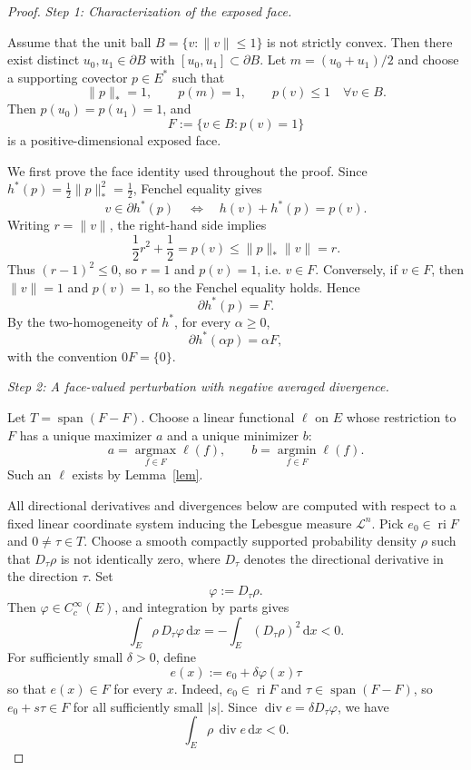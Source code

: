 \documentclass[10pt,a4paper]{amsart}
\numberwithin{equation}{section}
\newcommand{\ri}{\operatorname{ri}}
\newcommand{\diver}{\operatorname{div}}
\newcommand{\argmin}{\operatorname*{argmin}}
\newcommand{\argmax}{\operatorname*{argmax}}
\newcommand{\dd}{\mathrm d}
\begin{document}
	\begin{proof}
	
	\emph{Step 1: Characterization of the exposed face.} 
	
	Assume that the unit ball $B=\{v:\|v\|\le1\}$ is not strictly convex. Then there exist distinct $u_0,u_1\in\partial B$ with $[u_0,u_1]\subset\partial B$. Let $m=(u_0+u_1)/2$ and choose a supporting covector $p\in E^*$ such that
		\[
		\|p\|_*=1,
		\qquad p(m)=1,
		\qquad p(v)\le1\quad\forall v\in B.
		\]
		Then $p(u_0)=p(u_1)=1$, and
		\[
		F:=\{v\in B:p(v)=1\}
		\]
		is a positive-dimensional exposed face.
		
		We first prove the face identity used throughout the proof. Since $h^*(p)=\frac12\|p\|_*^2=\frac12$, Fenchel equality gives
		\[
		v\in\partial h^*(p)
		\quad\Longleftrightarrow\quad
		h(v)+h^*(p)=p(v).
		\]
		Writing $r=\|v\|$, the right-hand side implies
		\[
		\frac12 r^2+\frac12=p(v)\le \|p\|_*\|v\|=r.
		\]
		Thus $(r-1)^2\le0$, so $r=1$ and $p(v)=1$, i.e. $v\in F$. Conversely, if $v\in F$, then $\|v\|=1$ and $p(v)=1$, so the Fenchel equality holds. Hence
		\[
		\partial h^*(p)=F.
		\]
		By the two-homogeneity of $h^*$, for every $\alpha\ge0$,
		\[
		\partial h^*(\alpha p)=\alpha F,
		\]
		with the convention $0F=\{0\}$.
		
		\medskip
	\noindent	\emph{Step 2: A face-valued perturbation with negative averaged divergence.}
		
		Let $T=\operatorname{span}(F-F)$. Choose a linear functional $\ell$ on $E$ whose restriction to $F$ has a unique maximizer $a$ and a unique minimizer $b$:
		\[
		a=\argmax_{f\in F}\ell(f),
		\qquad b=\argmin_{f\in F}\ell(f).
		\]
		Such an $\ell$ exists by Lemma~\ref{lem}.
		
		All directional derivatives and divergences below are computed with respect to a fixed linear coordinate system inducing the Lebesgue measure \(\mathcal L^n\).
		Pick $e_0\in\ri F$ and $0\ne\tau\in T$. Choose a smooth compactly supported probability density \(\rho\) such that \(D_\tau\rho\) is not identically zero, where \(D_\tau\) denotes the directional derivative in the direction \(\tau\). Set
		\[
		\varphi:=D_\tau\rho.
		\]
		Then \(\varphi\in C_c^\infty(E)\), and integration by parts gives
		\[
		\int_E \rho\,D_\tau\varphi\,\dd x
		=-\int_E (D_\tau\rho)^2\,\dd x<0.
		\]
		For sufficiently small $\delta>0$, define
		\[
		e(x):=e_0+\delta\varphi(x)\tau
		\]
		so that $e(x)\in F$ for every $x$. Indeed, \(e_0\in\ri F\) and
		\(\tau\in\operatorname{span}(F-F)\), so \(e_0+s\tau\in F\) for all sufficiently small
		\(|s|\). Since \(\diver e=\delta D_\tau\varphi\), we have
		\begin{equation}\label{eq:face-negative-divergence}
			\int_E \rho\,\diver e\,\dd x<0.
		\end{equation}
		

\end{proof}
\end{document}
